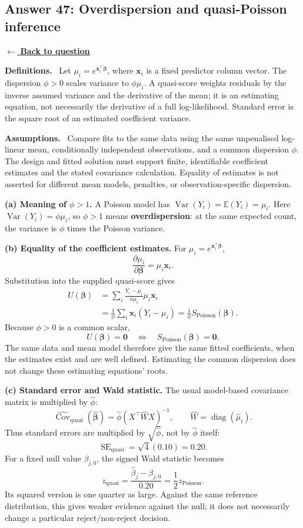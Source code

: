 \documentclass[11pt,a4paper]{article}
\newcommand{\E}{\mathbb{E}}
\newcommand{\answernav}[1]{%
  \label{answer:#1}%
  \noindent\hyperref[question:#1]{$\leftarrow$ \textbf{Back to question}}%
  \par\smallskip}
\newcommand{\studyheading}[1]{%
  \par\medskip\noindent\textcolor{statblue}{\textbf{#1.}}\ }
\begin{document}
\clearpage

\subsection{Answer 47: Overdispersion and quasi-Poisson inference}
\answernav{47}

\studyheading{Definitions}
Let $\mu_i=e^{\mathbf x_i^\top\boldsymbol\beta}$, where $\mathbf x_i$ is a fixed predictor column vector.
The dispersion $\phi>0$ scales variance to $\phi\mu_i$.
A quasi-score weights residuals by the inverse assumed variance and the derivative of the mean; it is an estimating equation, not necessarily the derivative of a full log-likelihood.
Standard error is the square root of an estimated coefficient variance.

\studyheading{Assumptions}
Compare fits to the same data using the same unpenalised log-linear mean, conditionally independent observations, and a common dispersion $\phi$.
The design and fitted solution must support finite, identifiable coefficient estimates and the stated covariance calculation.
Equality of estimates is not asserted for different mean models, penalties, or observation-specific dispersion.

\textbf{(a) Meaning of $\phi>1$.}
A Poisson model has $\operatorname{Var}(Y_i)=\E(Y_i)=\mu_i$.
Here $\operatorname{Var}(Y_i)=\phi\mu_i$, so $\phi>1$ means
\textbf{overdispersion}: at the same expected count, the variance is
$\phi$ times the Poisson variance.

\textbf{(b) Equality of the coefficient estimates.}
For $\mu_i=e^{\mathbf x_i^\top\boldsymbol\beta}$,
\[
\frac{\partial\mu_i}{\partial\boldsymbol\beta}=\mu_i\mathbf x_i.
\]
Substitution into the supplied quasi-score gives
\begin{align*}
U(\boldsymbol\beta)
&=\sum_i\frac{Y_i-\mu_i}{\phi\mu_i}\mu_i\mathbf x_i\\
&=\frac1\phi\sum_i\mathbf x_i(Y_i-\mu_i)
=\boxed{\frac1\phi S_{\mathrm{Poisson}}(\boldsymbol\beta)}.
\end{align*}
Because $\phi>0$ is a common scalar,
\[
U(\boldsymbol\beta)=\mathbf0
\quad\Longleftrightarrow\quad
S_{\mathrm{Poisson}}(\boldsymbol\beta)=\mathbf0.
\]
The same data and mean model therefore give the same fitted coefficients,
when the estimates exist and are well defined. Estimating the common
dispersion does not change these estimating equations' roots.

\textbf{(c) Standard error and Wald statistic.}
The usual model-based covariance matrix is multiplied by $\hat\phi$:
\[
\widehat{\operatorname{Cov}}_{\mathrm{quasi}}(\widehat{\boldsymbol\beta})
=\hat\phi(X^\top\widehat WX)^{-1},
\qquad \widehat W=\operatorname{diag}(\widehat\mu_i).
\]
Thus standard errors are multiplied by $\sqrt{\hat\phi}$, not by
$\hat\phi$ itself:
\[
\boxed{\operatorname{SE}_{\mathrm{quasi}}=\sqrt4(0.10)=0.20.}
\]
For a fixed null value $\beta_{j,0}$, the signed Wald statistic becomes
\[
z_{\mathrm{quasi}}
=\frac{\widehat\beta_j-\beta_{j,0}}{0.20}
=\frac12z_{\mathrm{Poisson}}.
\]
Its squared version is one quarter as large. Against the same reference
distribution, this gives weaker evidence against the null; it does not
necessarily change a particular reject/non-reject decision.
\end{document}
